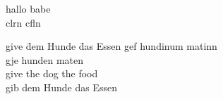 \documentclass{article}
\begin{document}
\begin{exe}
\ex \gll hallo babe\\
\color{blue}clrn \color{black}cfln\\
\end{exe}


\begin{exe}
    \setcounter{xnumi}{23}
    \ex \begin{tabbing}
      give \= dem Hunde \= das Essen \kill
      \color{DarkBlue} gef \> \color{DarkGreen}  hundinum \> \color{black}  matinn \\
      gje \> hunden \> maten\\
      give \> the dog \> the food \\
      gib \> dem Hunde \> das Essen
    \end{tabbing}
\end{exe}
\end{document}
